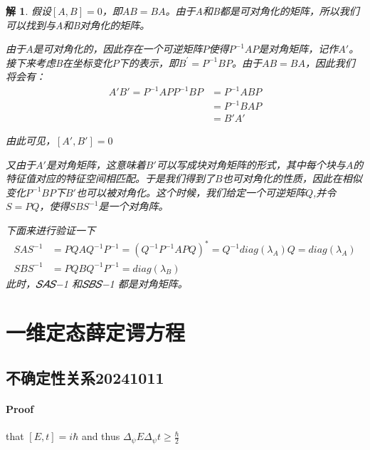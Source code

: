 \documentclass{article}
\newtheorem{solution}{解}
\begin{document}
\begin{solution}
    假设$[A,B] =0$，即$AB=BA$。由于A和B都是可对角化的矩阵，所以我们可以找到与A和B对角化的矩阵。

    由于$A$是可对角化的，因此存在一个可逆矩阵$P$使得$P^{-1}AP$是对角矩阵，记作$A'$。接下来考虑B在坐标变化$P$下的表示，即$B^\prime=P^{-1}BP$。由于$AB=BA$，因此我们将会有：
    \begin{align*}
        A'B'=P^{-1}APP^{-1}BP&=P^{-1}ABP\\
        &=P^{-1}BAP\\
        &=B'A'
    \end{align*}

    由此可见，$[A',B']=0$

    又由于$A'$是对角矩阵，这意味着$𝐵′$可以写成块对角矩阵的形式，其中每个块与$A$的特征值对应的特征空间相匹配。于是我们得到了$B$也可对角化的性质，因此在相似变化$P^{-1}BP$下$B'$也可以被对角化。这个时候，我们给定一个可逆矩阵$Q$,并令$S=PQ$，使得$SBS^{-1}$是一个对角阵。

    下面来进行验证一下
    \begin{align*}
        SAS^{-1}&=PQAQ^{-1}P^{-1}=(Q^{-1}P^{-1}APQ)^*=Q^{-1}diag(\lambda_A)Q=diag(\lambda_A)\\
        SBS^{-1}&=PQBQ^{-1}P^{-1}=diag(\lambda_B)
    \end{align*}
此时，𝑆𝐴𝑆−1 和𝑆𝐵𝑆−1 都是对角矩阵。
\end{solution}

\section{一维定态薛定谔方程}
\subsection{不确定性关系20241011}
\paragraph{Proof}that $[E,t]=i\hbar$ and thus $\displaystyle\Delta_\psi E\Delta_\psi t\geqslant \frac{\hbar}{2}$
\end{document}

